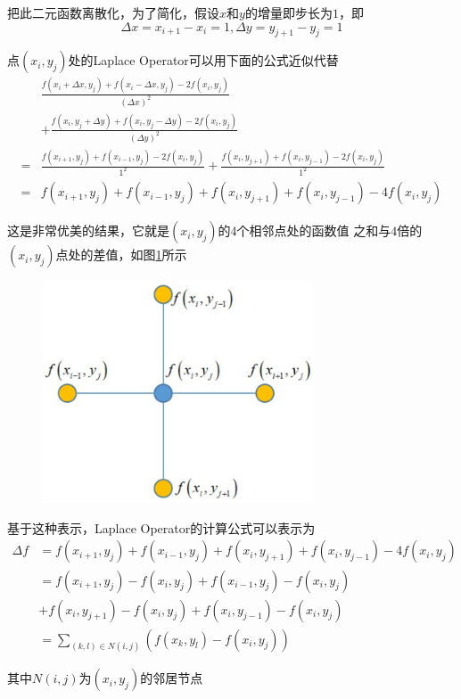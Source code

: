 \documentclass[lang=cn,10pt]{elegantbook}
\begin{document}
\par 把此二元函数离散化，为了简化，假设$x$和$y$的增量即步长为$1$，即
$$
	\Delta x =x_{i+1} - x_i=1, \Delta y =y_{j+1} - y_j=1
$$
\par 点$(x_i, y_j)$处的Laplace Operator可以用下面的公式近似代替
\begin{equation*}
	\begin{aligned}
		  & \frac{f\left(x_i+\Delta x,y_j\right)+f\left(x_i-\Delta x,y_j\right)-2f\left(x_i,y_j\right)}{\left(\Delta x\right)^2}
		\\&+\frac{f\left(x_i,y_j+\Delta y\right)+f\left(x_i,y_j-\Delta y\right)-2f\left(x_i,y_j\right)}{\left(\Delta y\right)^2}                                                             \\
		= & \frac{f\left(x_{i+1},y_j\right)+f\left(x_{i-1},y_j\right)-2f\left(x_i,y_j\right)}{1^2}+\frac{f\left(x_i,y_{j+1}\right)+f\left(x_i,y_{j-1}\right)-2f\left(x_i,y_j\right)}{1^2} \\
		= & f\left(x_{i+1},y_j\right)+f\left(x_{i-1},y_j\right)+f\left(x_i,y_{j+1}\right)+f\left(x_i,y_{j-1}\right)-4f\left(x_i,y_j\right)
	\end{aligned}
\end{equation*}
\par 这是非常优美的结果，它就是$(x_i,y_j)$的$4$个相邻点处的函数值
之和与$4$倍的$(x_i,y_j)$点处的差值，如图\ref{aj}所示

\begin{figure}[h]
	\centering
	\includegraphics[width = 8cm]{img/aj.png}
	\caption{}
	\label{aj}
\end{figure}
\par 基于这种表示，Laplace Operator的计算公式可以表示为
\begin{equation}
	\begin{aligned}
		\Delta f & =f\left(x_{i+1},y_j\right)+f\left(x_{i-1},y_j\right)+f\left(x_i,y_{j+1}\right)+f\left(x_i,y_{j-1}\right)-4f\left(x_i,y_j\right) \\
		         & =f\left(x_{i+1},y_j\right)-f\left(x_i,y_j\right)+f\left(x_{i-1},y_j\right)-f\left(x_i,y_j\right)                                \\
		         & +f\left(x_i,y_{j+1}\right)-f\left(x_i,y_j\right)+f\left(x_i,y_{j-1}\right)-f\left(x_i,y_j\right)                                \\
		         & =\sum_{(k,l)\in N(i,j)}\left(f\left(x_k,y_l\right)-f\left(x_i,y_j\right)\right)
	\end{aligned}
\end{equation}
\par 其中$N(i,j)$为$(x_i,y_j)$的邻居节点
\end{document}
